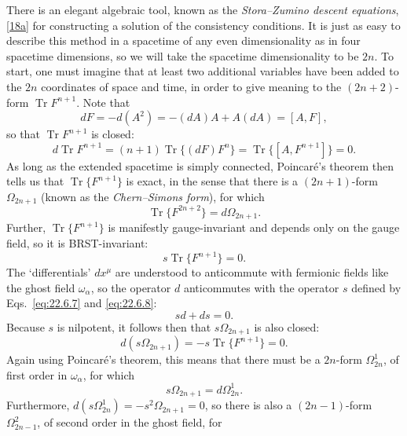 There is an elegant algebraic tool, known as the
\emph{Stora--Zumino descent equations},\hyperref[ch22-ref-18a]{[18a]} for
constructing a solution of the consistency conditions. It is just as easy
to describe this method in a spacetime of any even dimensionality as in
four spacetime dimensions, so we will take the spacetime dimensionality to
be $2n$. To start, one must imagine that at least two additional variables
have been added to the $2n$ coordinates of space and time, in order to give
meaning to the $(2n+2)$-form $\operatorname{Tr}F^{n+1}$. Note that
\begin{equation}
 dF=-d(A^2)=-(dA)A+A(dA)=[A,F],
 \tag{22.6.22}\label{eq:22.6.22}
\end{equation}
so that $\operatorname{Tr}F^{n+1}$ is closed:
\begin{equation}
 d\operatorname{Tr}F^{n+1}
 =(n+1)\operatorname{Tr}\{(dF)F^n\}
 =\operatorname{Tr}\{[A,F^{n+1}]\}=0.
 \tag{22.6.23}\label{eq:22.6.23}
\end{equation}
As long as the extended spacetime is simply connected, Poincaré's theorem
then tells us that $\operatorname{Tr}\{F^{n+1}\}$ is exact, in the sense
that there is a $(2n+1)$-form $\Omega_{2n+1}$ (known as the
\emph{Chern--Simons form}), for which
\begin{equation}
 \operatorname{Tr}\{F^{2n+2}\}=d\Omega_{2n+1}.
 \tag{22.6.24}\label{eq:22.6.24}
\end{equation}
Further, $\operatorname{Tr}\{F^{n+1}\}$ is manifestly gauge-invariant and
depends only on the gauge field, so it is BRST-invariant:
\begin{equation}
 s\operatorname{Tr}\{F^{n+1}\}=0.
 \tag{22.6.25}\label{eq:22.6.25}
\end{equation}
The `differentials' $dx^\mu$ are understood to anticommute with fermionic
fields like the ghost field $\omega_\alpha$, so the operator $d$
anticommutes with the operator $s$ defined by Eqs.~\eqref{eq:22.6.7} and
\eqref{eq:22.6.8}:
\[
 sd+ds=0.
\]
Because $s$ is nilpotent, it follows then that $s\Omega_{2n+1}$ is also
closed:
\[
 d(s\Omega_{2n+1})=-s\operatorname{Tr}\{F^{n+1}\}=0.
\]
Again using Poincaré's theorem, this means that there must be a $2n$-form
$\Omega^1_{2n}$, of first order in $\omega_\alpha$, for which
\begin{equation}
 s\Omega_{2n+1}=d\Omega^1_{2n}.
 \tag{22.6.26}\label{eq:22.6.26}
\end{equation}
Furthermore, $d(s\Omega^1_{2n})=-s^2\Omega_{2n+1}=0$, so there is also a
$(2n-1)$-form $\Omega^2_{2n-1}$, of second order in the ghost field, for
